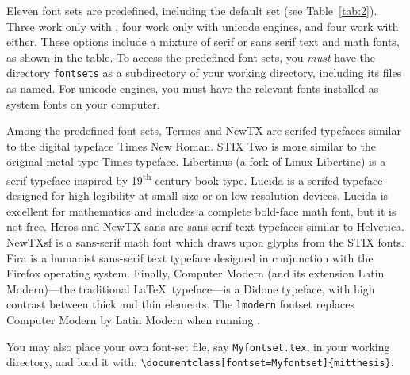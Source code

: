 \documentclass[11pt]{article}
\newcommand*\pdfTeX{\hologo{pdfTeX}}
\begin{document}
Eleven font sets are predefined, including the default set (see Table~\ref{tab:2}).  Three work only with \pdfTeX, four work only with unicode engines, and four work with either.  These options include a mixture of serif or sans serif text and math fonts, as shown in the table. To access the predefined font sets, you \textit{must} have the directory \texttt{fontsets} as a subdirectory of your working directory, including its files as named. For unicode engines, you must have the relevant fonts installed as system fonts on your computer.

Among the predefined font sets, Termes and NewTX are serifed typefaces similar to the digital typeface Times New Roman.  STIX Two is more similar to the original metal-type Times typeface. Libertinus (a fork of Linux Libertine) is a serif typeface inspired by 19\textsuperscript{th} century book type. Lucida is a serifed typeface designed for high legibility at small size or on low resolution devices. Lucida is excellent for mathematics and includes a complete bold-face math font, but it is not free. Heros and NewTX-sans are sans-serif text typefaces similar to Helvetica. NewTXsf is a sans-serif math font which draws upon glyphs from the STIX fonts. Fira is a humanist sans-serif text typeface designed in conjunction with the Firefox operating system. Finally, Computer Modern (and its extension Latin Modern)---the traditional \LaTeX\ typeface---is a Didone typeface, with high contrast between thick and thin elements.  The \texttt{lmodern} fontset replaces Computer Modern by Latin Modern when running \pdfTeX.

You may also place your own font-set file, say \texttt{Myfontset.tex}, in your working directory, and load it with:
\verb|\documentclass[fontset=Myfontset]{mitthesis}|.
\end{document}
